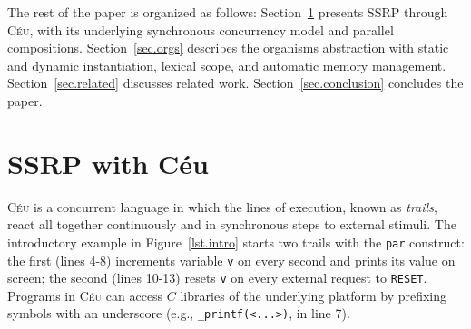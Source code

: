 \documentclass{acm_proc_article-sp}
\newcommand{\CEU}{\textsc{C\'{e}u}\xspace}
\newcommand{\code}[1] {{\small{\texttt{#1}}}}
\newcommand{\1}{\;}
\newcommand{\2}{\;\;}
\newcommand{\3}{\;\;\;}
\newcommand{\5}{\;\;\;\;\;}
\begin{document}

The rest of the paper is organized as follows:
Section~\ref{sec.ceu} presents SSRP through \CEU, with its underlying 
synchronous concurrency model and parallel compositions.
Section~\ref{sec.orgs} describes the organisms abstraction with static and 
dynamic instantiation, lexical scope, and automatic memory management.
Section~\ref{sec.related} discusses related work.
Section~\ref{sec.conclusion} concludes the paper.

\section{SSRP with C\'eu}
\label{sec.ceu}

\CEU is a concurrent language in which the lines of execution, known as 
\emph{trails}, react all together continuously and in synchronous steps to 
external stimuli.
%
%
The introductory example in Figure~\ref{lst.intro} starts two trails with the 
\code{par} construct: the first (lines 4-8) increments variable \code{v} on 
every second and prints its value on screen; the second (lines 10-13) resets 
\code{v} on every external request to \code{RESET}.
%
%
Programs in \CEU can access $C$ libraries of the underlying platform by 
prefixing symbols with an underscore (e.g., \code{\_printf(<...>)}, in line 7).
\end{document}
